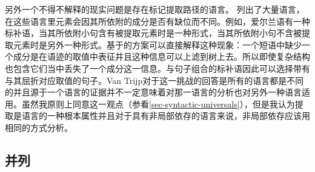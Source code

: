 另外一个不得不解释的现实问题是存在标记提取路径的语言。 \citet*{BMS2001a}列出了大量语言，在这些语言里元素会因其所依附的成分是否有缺位而不同。例如，爱尔兰语有一种标补语，当其所依附小句含有被提取元素时是一种形式，当其所依附小句不含被提取元素时是另外一种形式。基于\slaschc 的方案可以直接解释这种现象：一个短语中缺少一个成分是在语迹的\slaschc 取值中表征并且这种信息可以上滤到树上去。所以即使复杂结构也包含它们当中丢失了一个成分这一信息。与句子组合的标补语因此可以选择带有与其屈折对应\slaschc 取值的句子。Van Trijp对于这一挑战的回答是所有的语言都是不同的\citep[]{vanTrijp2014a}并且源于一个语言的证据并不一定意味着对那一语言的分析也对另外一种语言适用。虽然我原则上同意这一观点（参看\ref{sec-syntactic-universals}），但是我认为提取是语言的一种根本属性并且对于具有非局部依存的语言来说，非局部依存应该用相同的方式分析。

\subsection{并列}
\label{sec-coordination}

